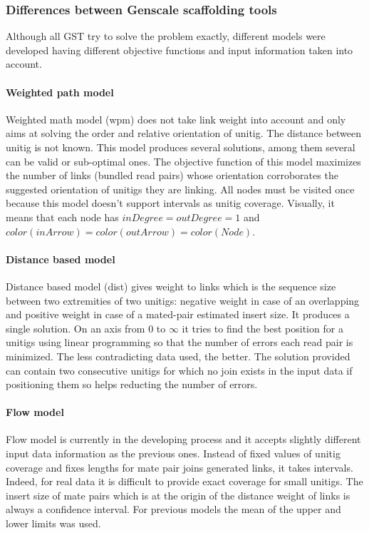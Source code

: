 \documentclass[12pt]{article}
\begin{document}
\subsubsection{Differences between Genscale scaffolding tools}\label{sec:gstdiff}
Although all GST try to solve the problem exactly, different models were developed having different objective functions and input information taken into account.
\paragraph*{Weighted path model} Weighted math model (wpm) does not take link weight into account and only aims at solving the order and relative orientation of unitig. The distance between unitig is not known. This model produces several solutions, among them several can be valid or sub-optimal ones. The objective function of this model maximizes the number of links (bundled read pairs) whose orientation corroborates the suggested orientation of unitigs they are linking. All nodes must be visited once because this model doesn't support intervals as unitig coverage. Visually, it means that each node has $inDegree=outDegree=1$ and $color(inArrow)=color(outArrow)=color(Node)$.

\paragraph*{Distance based model} Distance based model (dist) gives weight to links which is the sequence size between two extremities of two unitigs: negative weight in case of an overlapping and positive weight in case of a mated-pair estimated insert size. It produces a single solution. On an axis from 0 to $\infty$ it tries to find the best position for a unitigs using linear programming so that the number of errors each read pair is minimized. The less contradicting data used, the better. The solution provided can contain two consecutive unitigs for which no join exists in the input data if positioning them so helps reducting the number of errors. 


\paragraph*{Flow model} Flow model is currently in the developing process and it accepts slightly different input data information as the previous ones. Instead of fixed values of unitig coverage and fixes lengths for mate pair joins generated links, it takes intervals. Indeed, for real data it is difficult to provide exact coverage for small unitigs. The insert size of mate pairs which is at the origin of the distance weight of links is always a confidence interval. For previous models the mean of the upper and lower limits was used. 
\end{document}
